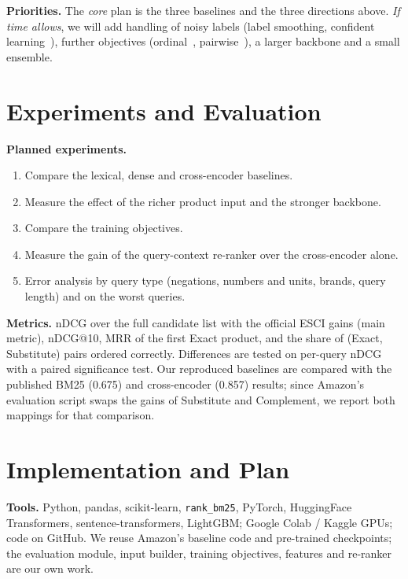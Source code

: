 \documentclass[11pt,a4paper]{article}
\begin{document}
\noindent\textbf{Priorities.} The \emph{core} plan is the three baselines and the three directions above. \emph{If time allows}, we will add handling of noisy labels (label smoothing, confident learning~\cite{cleanlab}), further objectives (ordinal~\cite{joint}, pairwise~\cite{pairwise}), a larger backbone and a small ensemble.

\section{Experiments and Evaluation}
\textbf{Planned experiments.}
\begin{enumerate}
  \item Compare the lexical, dense and cross-encoder baselines.
  \item Measure the effect of the richer product input and the stronger backbone.
  \item Compare the training objectives.
  \item Measure the gain of the query-context re-ranker over the cross-encoder alone.
  \item Error analysis by query type (negations, numbers and units, brands, query length) and on the worst queries.
\end{enumerate}

\noindent\textbf{Metrics.} nDCG over the full candidate list with the official ESCI gains (main metric), nDCG@10, MRR of the first Exact product, and the share of (Exact, Substitute) pairs ordered correctly. Differences are tested on per-query nDCG with a paired significance test. Our reproduced baselines are compared with the published BM25 (0.675) and cross-encoder (0.857) results; since Amazon's evaluation script swaps the gains of Substitute and Complement, we report both mappings for that comparison.

\section{Implementation and Plan}
\textbf{Tools.} Python, pandas, scikit-learn, \texttt{rank\_bm25}, PyTorch, HuggingFace Transformers, sentence-transformers, LightGBM; Google Colab / Kaggle GPUs; code on GitHub. We reuse Amazon's baseline code and pre-trained checkpoints; the evaluation module, input builder, training objectives, features and re-ranker are our own work.
\end{document}
